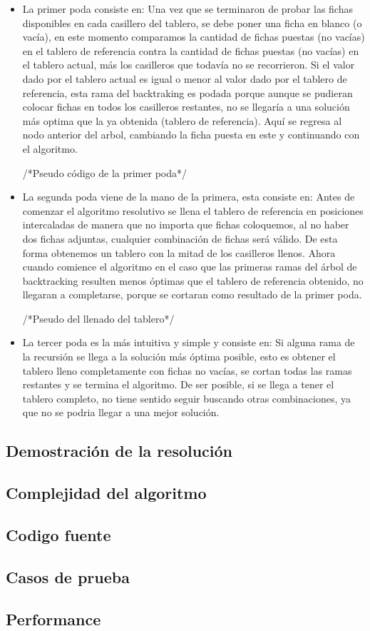 \begin{itemize}

\item La primer poda consiste en: Una vez que se terminaron de probar las fichas disponibles en cada casillero del tablero, se debe poner una ficha en blanco (o vac\'ia), en este momento comparamos la cantidad de fichas puestas (no vac\'ias) en el tablero de referencia contra la cantidad de fichas puestas (no vac\'ias) en el tablero actual, más los casilleros que todav\'ia no se recorrieron. Si el valor dado por el tablero actual es igual o menor al valor dado por el tablero de referencia, esta rama del backtraking es podada porque aunque se pudieran colocar fichas en todos los casilleros restantes, no se llegar\'ia a una soluci\'on más optima que la ya obtenida (tablero de referencia). Aqu\'i se regresa al nodo anterior del arbol, cambiando la ficha puesta en este y continuando con el algoritmo.

/*Pseudo código de la primer poda*/

\item La segunda poda viene de la mano de la primera, esta consiste en: Antes de comenzar el algoritmo resolutivo se llena el tablero de referencia en posiciones intercaladas de manera que no importa que fichas coloquemos, al no haber dos fichas adjuntas, cualquier combinaci\'on de fichas ser\'a v\'alido. De esta forma obtenemos un tablero con la mitad de los casilleros llenos. Ahora cuando comience el algoritmo en el caso que las primeras ramas del \'arbol de backtracking resulten menos \'optimas que el tablero de referencia obtenido, no llegaran a completarse, porque se cortaran como resultado de la primer poda.

/*Pseudo del llenado del tablero*/

\item La tercer poda es la m\'as intuitiva y simple y consiste en: Si alguna rama de la recursi\'on se llega a la soluci\'on m\'as \'optima posible, esto es obtener el tablero lleno completamente con fichas no vac\'ias, se cortan todas las ramas restantes y se termina el algoritmo. De ser posible, si se llega a tener el tablero completo, no tiene sentido seguir buscando otras combinaciones, ya que no se podria llegar a una mejor soluci\'on.

\end{itemize}

\subsection{Demostraci\'on de la resoluci\'on}

\subsection{Complejidad del algoritmo}

\subsection{Codigo fuente}

\subsection{Casos de prueba}

\subsection{Performance}
